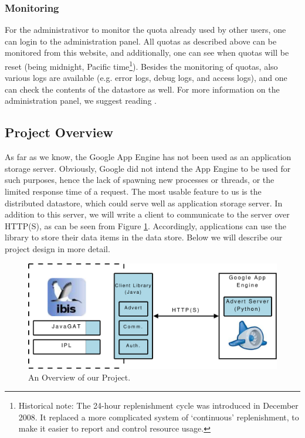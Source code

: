 \subsubsection{Monitoring}
For the administrativor to monitor the quota already used by other users, one can
login to the administration panel. All quotas as described above can be monitored
from this website, and additionally, one can see when quotas will be reset (being
midnight, Pacific time\footnote{Historical note: The 24-hour replenishment cycle
was introduced in December 2008. It replaced a more complicated system of
`continuous' replenishment, to make it easier to report and control resource
usage.}).  Besides the monitoring of quotas, also various logs are available
(e.g. error logs, debug logs, and access logs), and one can check the contents of
the datastore as well. For more information on the administration panel, we
suggest reading \cite{app-engine-admin}.

\subsection{Project Overview}
As far as we know, the Google App Engine has not been used as an application
storage server. Obviously, Google did not intend the App Engine to be used for
such purposes, hence the lack of spawning new processes or threads, or the
limited response time of a request. The most usable feature to us is the
distributed datastore, which could serve well as application storage
server. In addition to this server, we will write a client to communicate to the
server over HTTP(S), as can be seen from Figure \ref{related-overview}.
Accordingly, applications can use the library to store their data items in the
data store. Below we will describe our project design in more detail.

\begin{figure}[ht] %
\begin{center}
\includegraphics[width=14cm]{./figures/project_design.pdf} 
\caption{An Overview of our Project.\label{related-overview}}
\end{center}
\end{figure}


